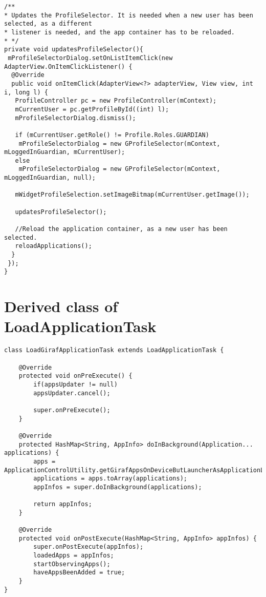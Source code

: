 \begin{lstlisting}[caption={The method instantiating the Profile Selector with the correct arguments each time a new user is selected, inside the OnListItemClick listener.}, label={lst:newprofileselectoronitemclick}]
/**
* Updates the ProfileSelector. It is needed when a new user has been selected, as a different
* listener is needed, and the app container has to be reloaded.
* */
private void updatesProfileSelector(){
 mProfileSelectorDialog.setOnListItemClick(new AdapterView.OnItemClickListener() {
  @Override
  public void onItemClick(AdapterView<?> adapterView, View view, int i, long l) {
   ProfileController pc = new ProfileController(mContext);
   mCurrentUser = pc.getProfileById((int) l);
   mProfileSelectorDialog.dismiss();
  
   if (mCurrentUser.getRole() != Profile.Roles.GUARDIAN)
    mProfileSelectorDialog = new GProfileSelector(mContext, mLoggedInGuardian, mCurrentUser);
   else
    mProfileSelectorDialog = new GProfileSelector(mContext, mLoggedInGuardian, null);
  
   mWidgetProfileSelection.setImageBitmap(mCurrentUser.getImage());
  
   updatesProfileSelector();
  
   //Reload the application container, as a new user has been selected.
   reloadApplications();
  }
 });
} 
\end{lstlisting}

\section{Derived class of LoadApplicationTask}

  \begin{lstlisting}[caption={The LoadGirafApplicationTask, derived from LoadApplicationTask. This is the derived class used by GirafFragment to load applications into view. Please note that all comments and the constructor have been removed to make the listing smaller}, label={lst:derivedlat}]
class LoadGirafApplicationTask extends LoadApplicationTask {
	
	@Override
	protected void onPreExecute() {
		if(appsUpdater != null)
		appsUpdater.cancel();
		
		super.onPreExecute();
	}
	
	@Override
	protected HashMap<String, AppInfo> doInBackground(Application... applications) {
		apps = ApplicationControlUtility.getGirafAppsOnDeviceButLauncherAsApplicationList(context);
		applications = apps.toArray(applications);
		appInfos = super.doInBackground(applications);
		
		return appInfos;
	}
	
	@Override
	protected void onPostExecute(HashMap<String, AppInfo> appInfos) {
		super.onPostExecute(appInfos);
		loadedApps = appInfos;
		startObservingApps();
		haveAppsBeenAdded = true;
	}
}
\end{lstlisting}